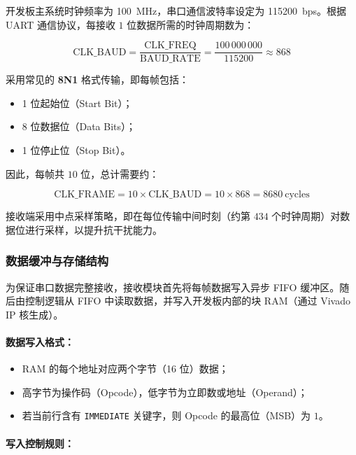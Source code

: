 \documentclass[lang=cn,a4paper,newtx]{elegantpaper}
\begin{document}
开发板主系统时钟频率为 \SI{100}{\mega\hertz}，串口通信波特率设定为 \SI{115200}{bps}。根据 UART 通信协议，每接收 $1$ 位数据所需的时钟周期数为：

\begin{equation}
  \text{CLK\_BAUD} = \frac{\text{CLK\_FREQ}}{\text{BAUD\_RATE}} = \frac{100\,000\,000}{115200} \approx 868
\end{equation}

采用常见的 \textbf{8N1} 格式传输，即每帧包括：

\begin{itemize}
  \item 1 位起始位（Start Bit）；
  \item 8 位数据位（Data Bits）；
  \item 1 位停止位（Stop Bit）。
\end{itemize}

因此，每帧共 $10$ 位，总计需要约：

\begin{equation}
  \text{CLK\_FRAME} = 10 \times \text{CLK\_BAUD} = 10 \times 868 = 8680\ \text{cycles}
\end{equation}

接收端采用中点采样策略，即在每位传输中间时刻（约第 $434$ 个时钟周期）对数据位进行采样，以提升抗干扰能力。

\subsubsection{数据缓冲与存储结构}

为保证串口数据完整接收，接收模块首先将每帧数据写入异步 FIFO 缓冲区。随后由控制逻辑从 FIFO 中读取数据，并写入开发板内部的块 RAM（通过 Vivado IP 核生成）。

\paragraph{数据写入格式：}

\begin{itemize}
  \item RAM 的每个地址对应两个字节（16 位）数据；
  \item 高字节为操作码（Opcode），低字节为立即数或地址（Operand）；
  \item 若当前行含有 \texttt{IMMEDIATE} 关键字，则 Opcode 的最高位（MSB）为 $1$。
\end{itemize}

\paragraph{写入控制规则：}
\end{document}
